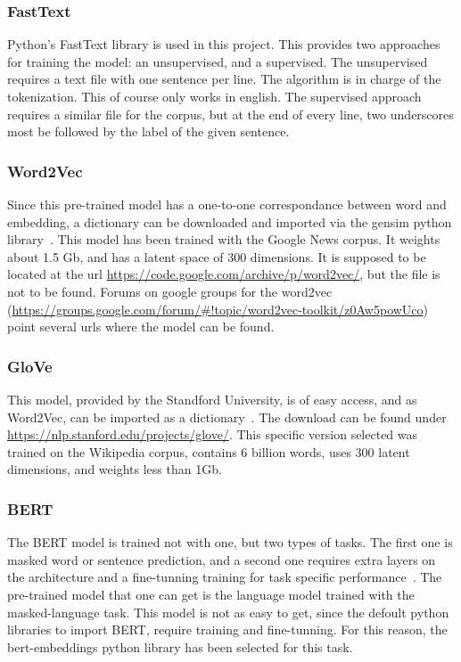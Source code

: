 \subsubsection{FastText}\label{subs:FastText}
Python's FastText library\cite{joulin2017fasttext} is used in this project. This provides two approaches for training the model: an unsupervised, and a supervised. The unsupervised requires a text file with one sentence per line. The algorithm is in charge of the tokenization. This of course only works in english. The supervised approach requires a similar file for the corpus, but at the end of every line, two underscores most be followed by the label of the given sentence.

\subsubsection{Word2Vec}\label{subs:Word2Vec}
Since this pre-trained model has a one-to-one correspondance between word and embedding, a dictionary can be downloaded and imported via the gensim python library~\cite{mikolov2013word2vec}. This model has been trained with the Google News corpus. It weights about 1.5 Gb, and has a latent space of 300 dimensions. It is supposed to be located at the url \url{https://code.google.com/archive/p/word2vec/}, but the file is not to be found. Forums on google groups for the word2vec (\url{https://groups.google.com/forum/#!topic/word2vec-toolkit/z0Aw5powUco}) point several urls where the model can be found.

\subsubsection{GloVe}\label{subs:GloVe}
This model, provided by the Standford University, is of easy access, and as Word2Vec, can be imported as a dictionary~\cite{penningto2014glove}. The download can be found under \url{https://nlp.stanford.edu/projects/glove/}. This specific version selected was trained on the Wikipedia corpus, contains 6 billion words, uses 300 latent dimensions, and weights less than 1Gb.

\subsubsection{BERT}\label{subs:BERT}
The BERT model is trained not with one, but two types of tasks. The first one is masked word or sentence prediction, and a second one requires extra layers on the architecture and a fine-tunning training for task specific performance~\cite{devlin2019bert}. The pre-trained model that one can get is the language model trained with the masked-language task. This model is not as easy to get, since the defoult python libraries to import BERT, require training and fine-tunning. For this reason, the bert-embeddings python library has been selected for this task.

